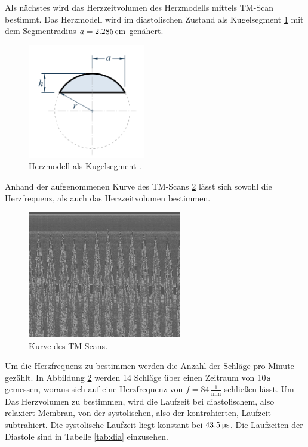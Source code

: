 Als nächstes wird das Herzzeitvolumen des Herzmodells mittels TM-Scan bestimmt.
Das Herzmodell wird im diastolischen Zustand als Kugelsegment \ref{fig:kugel}
mit dem Segmentradius $a=2.285\,\si{\centi\meter}$ genähert.
\begin{figure}[H]
  \centering
  \includegraphics[height=5cm]{bilder/kugel.png}
  \caption{Herzmodell als Kugelsegment \cite{kugel}.}
  \label{fig:kugel}
\end{figure}
Anhand der aufgenommenen Kurve des TM-Scans \ref{fig:tm} lässt sich sowohl die
Herzfrequenz, als auch das Herzzeitvolumen bestimmen.
\begin{figure}[H]
  \centering
  \includegraphics[width=0.6\textwidth]{bilder/TM-ScanHerz2.jpg}
  \caption{Kurve des TM-Scans.}
  \label{fig:tm}
\end{figure}
Um die Herzfrequenz zu bestimmen werden die Anzahl der Schläge pro Minute
gezählt. In Abbildung \ref{fig:tm} werden 14 Schläge über einen Zeitraum von
$10\,\si{\second}$ gemessen, woraus sich auf eine Herzfrequenz von $f = 84\,\frac{1}{\si{\minute}}$
schließen lässt.
Um Das Herzvolumen zu bestimmen, wird die Laufzeit bei diastolischem, also
relaxiert Membran, von der systolischen, also der kontrahierten, Laufzeit
subtrahiert. Die systolische Laufzeit liegt konstant bei $43.5\,\si{\micro\second}$.
Die Laufzeiten der Diastole sind in Tabelle \ref{tab:dia} einzusehen.
